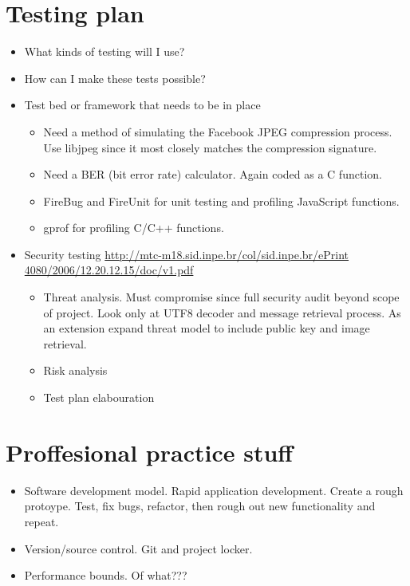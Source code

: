 \section{Testing plan}
    \begin{itemize}
	\item What kinds of testing will I use?
	\item How can I make these tests possible?
	\item Test bed or framework that needs to be in place
        \begin{itemize}
            \item Need a method of simulating the Facebook JPEG compression process. Use libjpeg since it most closely matches the compression signature.
            \item Need a BER (bit error rate) calculator. Again coded as a C function.
            \item FireBug and FireUnit for unit testing and profiling JavaScript functions.
            \item gprof for profiling C/C++ functions.
        \end{itemize}
        \item Security testing \url{http://mtc-m18.sid.inpe.br/col/sid.inpe.br/ePrint 4080/2006/12.20.12.15/doc/v1.pdf}
        \begin{itemize}
            \item Threat analysis. Must compromise since full security audit beyond scope of project. Look only at UTF8 decoder and message retrieval process. As an extension expand threat model to include public key and image retrieval.
            \item Risk analysis
            \item Test plan elabouration
        \end{itemize}
    \end{itemize}
    
    
\section{Proffesional practice stuff}
    \begin{itemize}
	\item Software development model. Rapid application development. Create a rough protoype. Test, fix bugs, refactor, then rough out new functionality and repeat.
	\item Version/source control. Git and project locker.
	\item Performance bounds. Of what???
    \end{itemize}
    
